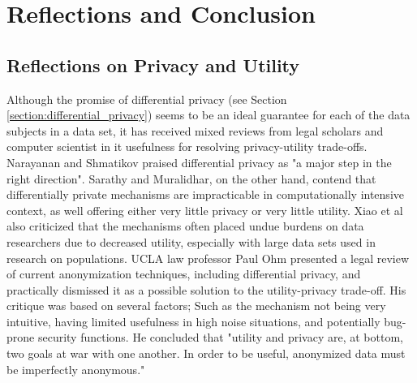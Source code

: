 
\chapter{Reflections and Conclusion}

%
%

\section{Reflections on Privacy and Utility }

Although the promise of differential privacy (see Section \ref{section:differential_privacy}) seems to be an ideal guarantee for each of the data subjects in a data set, it has received mixed reviews from legal scholars and computer scientist in it usefulness for resolving privacy-utility trade-offs. Narayanan and Shmatikov praised differential privacy as "a major step in the right direction\citep{narayanan2010myths}". Sarathy and Muralidhar, on the other hand, contend that differentially private mechanisms are impracticable in computationally intensive context, as well offering either very little privacy or very little utility\citep{Sarathy2011evaluating}. Xiao et al also criticized that the mechanisms often placed undue burdens on data researchers due to decreased utility, especially with large data sets used in research on populations\citep{xiao2011differential}. UCLA law professor Paul Ohm presented a legal review of current anonymization techniques, including differential privacy, and practically dismissed it as a possible solution to the utility-privacy trade-off. His critique was based on several factors; Such as the mechanism not being very intuitive, having limited usefulness in high noise situations, and potentially bug-prone security functions. He concluded that "utility and privacy are, at bottom, two goals at war with one another. In order to be useful, anonymized data must be imperfectly anonymous\citep{ohm2010brokenPrivacyPromise}."


